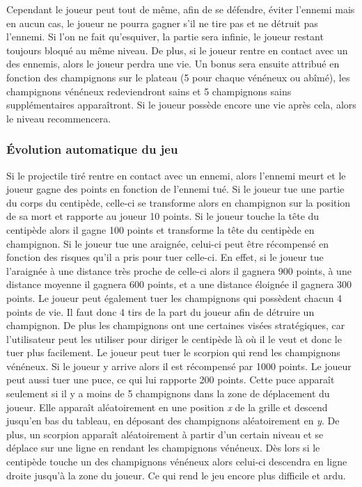 Cependant le joueur peut tout de même, afin de se défendre, éviter l'ennemi mais en aucun cas, le joueur ne pourra gagner s'il ne tire pas et ne détruit pas l'ennemi. Si l'on ne fait qu'esquiver, la partie sera infinie, le joueur restant toujours bloqué au même niveau. De plus, si le joueur rentre en contact avec un des ennemis, alors le joueur perdra une vie. Un bonus sera ensuite attribué en fonction des champignons sur le plateau (5 pour chaque vénéneux ou abîmé), les champignons vénéneux redeviendront sains et 5 champignons sains supplémentaires apparaîtront. Si le joueur possède encore une vie après cela, alors le niveau recommencera. 

\subsubsection{Évolution automatique du jeu}

Si le projectile tiré rentre en contact avec un ennemi, alors l'ennemi meurt et le joueur gagne des points en fonction de l'ennemi tué. Si le joueur tue une partie du corps du centipède, celle-ci se transforme alors en champignon sur la position de sa mort et rapporte au joueur 10 points. Si le joueur touche la tête du centipède alors il gagne 100 points et transforme la tête du centipède en champignon. Si le joueur tue une araignée, celui-ci peut être récompensé en fonction des risques qu'il a pris pour tuer celle-ci. En effet, si le joueur tue l'araignée à une distance très proche de celle-ci alors il gagnera 900 points, à une distance moyenne il gagnera 600 points, et a une distance éloignée il gagnera 300 points. Le joueur peut également tuer les champignons qui possèdent chacun 4 points de vie. Il faut donc 4 tirs de la part du joueur afin de détruire un champignon. De plus les champignons ont une certaines visées stratégiques, car l'utilisateur peut les utiliser pour diriger le centipède là où il le veut et donc le tuer plus facilement. Le joueur peut tuer le scorpion qui rend les champignons vénéneux. Si le joueur y arrive alors il est récompensé par 1000 points. Le joueur peut aussi tuer une puce, ce qui lui rapporte 200 points. Cette puce apparaît seulement si il y a moins de 5 champignons dans la zone de déplacement du joueur. Elle apparaît aléatoirement en une position \emph{x} de la grille et  descend jusqu'en bas du tableau, en déposant des champignons aléatoirement en \emph{y}. De plus, un scorpion apparaît aléatoirement à partir d'un certain niveau et se déplace sur une ligne en rendant les champignons vénéneux. Dès lors si le centipède touche un des champignons vénéneux alors celui-ci descendra en ligne droite jusqu'à la zone du joueur. Ce qui rend le jeu encore plus difficile et ardu.
